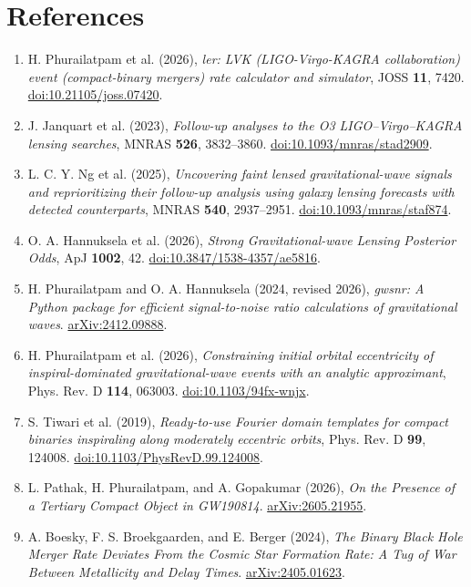 \documentclass[11pt]{article}
\begin{document}
\section*{References}
\small
\begin{enumerate}[itemsep=7pt]
\item H. Phurailatpam et al. (2026), \textit{ler: LVK (LIGO-Virgo-KAGRA collaboration) event (compact-binary mergers) rate calculator and simulator}, JOSS \textbf{11}, 7420. \href{https://doi.org/10.21105/joss.07420}{doi:10.21105/joss.07420}.
\item J. Janquart et al. (2023), \textit{Follow-up analyses to the O3 LIGO--Virgo--KAGRA lensing searches}, MNRAS \textbf{526}, 3832--3860. \href{https://doi.org/10.1093/mnras/stad2909}{doi:10.1093/mnras/stad2909}.
\item L. C. Y. Ng et al. (2025), \textit{Uncovering faint lensed gravitational-wave signals and reprioritizing their follow-up analysis using galaxy lensing forecasts with detected counterparts}, MNRAS \textbf{540}, 2937--2951. \href{https://doi.org/10.1093/mnras/staf874}{doi:10.1093/mnras/staf874}.
\item O. A. Hannuksela et al. (2026), \textit{Strong Gravitational-wave Lensing Posterior Odds}, ApJ \textbf{1002}, 42. \href{https://doi.org/10.3847/1538-4357/ae5816}{doi:10.3847/1538-4357/ae5816}.
\item H. Phurailatpam and O. A. Hannuksela (2024, revised 2026), \textit{gwsnr: A Python package for efficient signal-to-noise ratio calculations of gravitational waves}. \href{https://arxiv.org/abs/2412.09888}{arXiv:2412.09888}.
\item H. Phurailatpam et al. (2026), \textit{Constraining initial orbital eccentricity of inspiral-dominated gravitational-wave events with an analytic approximant}, Phys. Rev. D \textbf{114}, 063003. \href{https://doi.org/10.1103/94fx-wnjx}{doi:10.1103/94fx-wnjx}.
\item S. Tiwari et al. (2019), \textit{Ready-to-use Fourier domain templates for compact binaries inspiraling along moderately eccentric orbits}, Phys. Rev. D \textbf{99}, 124008. \href{https://doi.org/10.1103/PhysRevD.99.124008}{doi:10.1103/PhysRevD.99.124008}.
\item L. Pathak, H. Phurailatpam, and A. Gopakumar (2026), \textit{On the Presence of a Tertiary Compact Object in GW190814}. \href{https://arxiv.org/abs/2605.21955}{arXiv:2605.21955}.
\item A. Boesky, F. S. Broekgaarden, and E. Berger (2024), \textit{The Binary Black Hole Merger Rate Deviates From the Cosmic Star Formation Rate: A Tug of War Between Metallicity and Delay Times}. \href{https://arxiv.org/abs/2405.01623}{arXiv:2405.01623}.

\end{enumerate}
\end{document}
